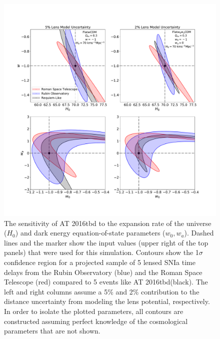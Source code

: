 \documentclass[12pt]{article}
\def\SNABC{AT 2016tbd\xspace}
\begin{document}
\begin{figure}
{     
    \label{fig:class}
    }
\end{figure}


\clearpage
\begin{figure}
    \centering
    \includegraphics[draft=False,trim={2cm, 3cm, 3cm, 4cm},clip,width=\textwidth]{Paper/Figures/snrequiem_hw_w0wa_apples_to_lsst_ngrst_4panel.pdf}
    \caption{  
    The sensitivity of \SNABC to the expansion rate of the universe ($H_0$) and dark energy equation-of-state parameters ($w_0, w_a$). Dashed lines and the  marker show the input values (upper right of the top panels) that were used for this simulation. Contours show the 1$\sigma$ confidence region for a projected sample of 5 lensed SNIa time delays from the Rubin Observatory (blue) and the Roman Space Telescope (red) compared to 5 events like \SNABC (black).  The left and right columns assume a 5\% and 2\% contribution to the distance uncertainty from modeling the lens potential, respectively. 
    In order to isolate the plotted parameters, all contours are constructed assuming perfect knowledge of the cosmological parameters that are not shown. 
    }
    \label{fig:cosmo}
\end{figure}
\end{document}

